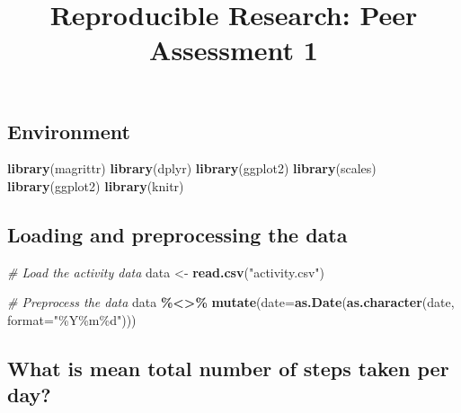 \documentclass[
]{article}
\title{Reproducible Research: Peer Assessment 1}
\author{}
\date{\vspace{-2.5em}}
\newenvironment{Shaded}{\begin{snugshade}}{\end{snugshade}}
\newcommand{\AttributeTok}[1]{\textcolor[rgb]{0.13,0.29,0.53}{#1}}
\newcommand{\CommentTok}[1]{\textcolor[rgb]{0.56,0.35,0.01}{\textit{#1}}}
\newcommand{\FunctionTok}[1]{\textcolor[rgb]{0.13,0.29,0.53}{\textbf{#1}}}
\newcommand{\NormalTok}[1]{#1}
\newcommand{\OtherTok}[1]{\textcolor[rgb]{0.56,0.35,0.01}{#1}}
\newcommand{\SpecialCharTok}[1]{\textcolor[rgb]{0.81,0.36,0.00}{\textbf{#1}}}
\newcommand{\StringTok}[1]{\textcolor[rgb]{0.31,0.60,0.02}{#1}}
\begin{document}
\maketitle

\hypertarget{environment}{%
\subsection{Environment}\label{environment}}

\begin{Shaded}
\begin{Highlighting}[]
\FunctionTok{library}\NormalTok{(magrittr)}
\FunctionTok{library}\NormalTok{(dplyr)}
\FunctionTok{library}\NormalTok{(ggplot2)}
\FunctionTok{library}\NormalTok{(scales)}
\FunctionTok{library}\NormalTok{(ggplot2)}
\FunctionTok{library}\NormalTok{(knitr)}
\end{Highlighting}
\end{Shaded}

\hypertarget{loading-and-preprocessing-the-data}{%
\subsection{Loading and preprocessing the
data}\label{loading-and-preprocessing-the-data}}

\begin{Shaded}
\begin{Highlighting}[]
\CommentTok{\# Load the activity data}
\NormalTok{data }\OtherTok{\textless{}{-}} \FunctionTok{read.csv}\NormalTok{(}\StringTok{"activity.csv"}\NormalTok{)}

\CommentTok{\# Preprocess the data}
\NormalTok{data }\SpecialCharTok{\%\textless{}\textgreater{}\%}
  \FunctionTok{mutate}\NormalTok{(}\AttributeTok{date=}\FunctionTok{as.Date}\NormalTok{(}\FunctionTok{as.character}\NormalTok{(date, }\AttributeTok{format=}\StringTok{"\%Y\%m\%d"}\NormalTok{)))}
\end{Highlighting}
\end{Shaded}

\hypertarget{what-is-mean-total-number-of-steps-taken-per-day}{%
\subsection{What is mean total number of steps taken per
day?}\label{what-is-mean-total-number-of-steps-taken-per-day}}
\end{document}
